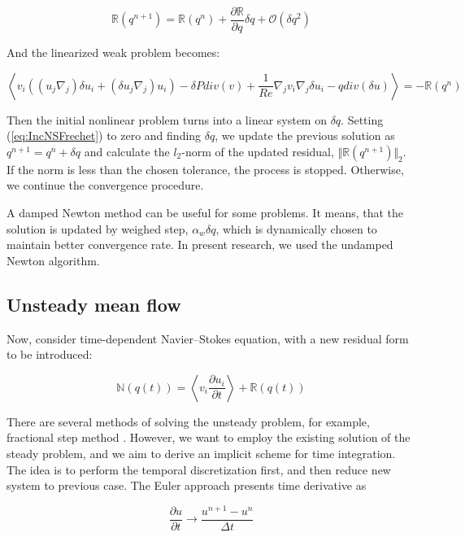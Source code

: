 \begin{equation}
\label{eq:IncNSFrechet}
\mathbb{R}(q^{n+1}) = \mathbb{R}(q^n) + \frac{\partial \mathbb{R}}{\partial q} \delta q + \mathcal{O}(\delta q^2)
\end{equation}

And the linearized weak problem becomes:

\begin{equation}
\left<v_i \left( (u_j \nabla_j) \delta u_i + (\delta  u_j \nabla_j) u_i \right) - \delta  P div(v) + \frac{1}{Re}\nabla_j v_i \nabla_j \delta  u_i - q div(\delta u)\right> = - \mathbb{R}(q^n) 
\end{equation}

Then the initial nonlinear problem turns into a linear system on $\delta q$. Setting (\ref{eq:IncNSFrechet}) to zero and finding $\delta q$, we update the previous solution as $q^{n+1} = q^n + \delta q$ and calculate the $l_2$-norm of the updated residual, $\Vert \mathbb{R}(q^{n+1}) \Vert _2$. If the norm is less than the chosen tolerance, the process is stopped. Otherwise, we continue the convergence procedure.

A damped Newton method can be useful for some problems. It means, that the solution is updated by weighed step, $\alpha_w \delta q$, which is dynamically chosen to maintain better convergence rate. In present research, we used the undamped Newton algorithm.

\subsection{Unsteady mean flow}

Now, consider time-dependent Navier--Stokes equation, with a new residual form to be introduced:

\begin{equation}
    \mathbb{N}(q(t)) = \left< v_i \frac{\partial u_i}{\partial t} \right> + \mathbb{R}(q(t))
\end{equation}

There are several methods of solving the unsteady problem, for example, fractional step method \cite{DoneaFrac}. However, we want to employ the existing solution of the steady problem, and we aim to derive an implicit scheme for time integration. The idea is to perform the temporal discretization first, and then reduce new system to previous case. The Euler approach presents time derivative as

\begin{equation*}
    \frac{\partial u}{\partial t} \rightarrow \frac{u^{n+1} - u^n}{\Delta t}
\end{equation*}

